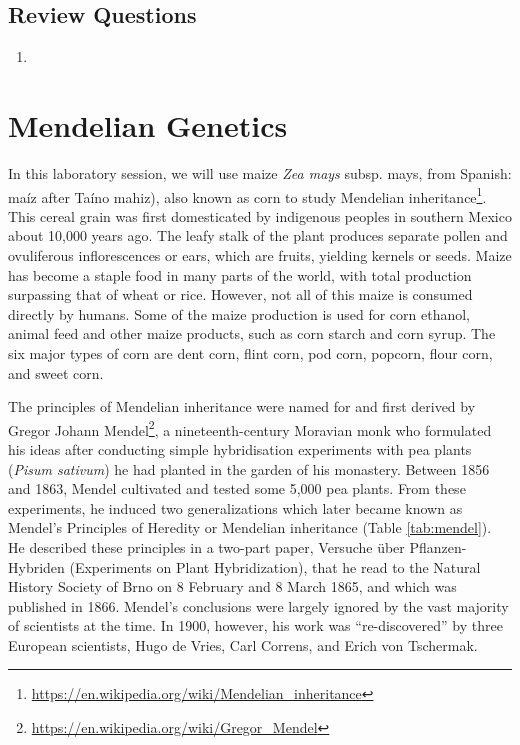 \documentclass[]{book}
\let\rmarkdownfootnote\footnote%
\def\footnote{\protect\rmarkdownfootnote}
\renewcommand{\href}[2]{#2\footnote{\url{#1}}}
\theoremstyle{definition}
\theoremstyle{definition}
\theoremstyle{definition}
\theoremstyle{remark}
\begin{document}
\section{Review Questions}\label{review-questions-1}

\begin{enumerate}
\def\labelenumi{\arabic{enumi}.}
\item
\end{enumerate}

\chapter{Mendelian Genetics}\label{mendelian-genetics}

In this laboratory session, we will use maize \emph{Zea mays} subsp.
mays, from Spanish: maíz after Taíno mahiz), also known as corn to study
\href{https://en.wikipedia.org/wiki/Mendelian_inheritance}{Mendelian
inheritance}. This cereal grain was first domesticated by indigenous
peoples in southern Mexico about 10,000 years ago. The leafy stalk of
the plant produces separate pollen and ovuliferous inflorescences or
ears, which are fruits, yielding kernels or seeds. Maize has become a
staple food in many parts of the world, with total production surpassing
that of wheat or rice. However, not all of this maize is consumed
directly by humans. Some of the maize production is used for corn
ethanol, animal feed and other maize products, such as corn starch and
corn syrup. The six major types of corn are dent corn, flint corn, pod
corn, popcorn, flour corn, and sweet corn.

The principles of Mendelian inheritance were named for and first derived
by \href{https://en.wikipedia.org/wiki/Gregor_Mendel}{Gregor Johann
Mendel}, a nineteenth-century Moravian monk who formulated his ideas
after conducting simple hybridisation experiments with pea plants
(\emph{Pisum sativum}) he had planted in the garden of his monastery.
Between 1856 and 1863, Mendel cultivated and tested some 5,000 pea
plants. From these experiments, he induced two generalizations which
later became known as Mendel's Principles of Heredity or Mendelian
inheritance (Table \ref{tab:mendel}). He described these principles in a
two-part paper, Versuche über Pflanzen-Hybriden (Experiments on Plant
Hybridization), that he read to the Natural History Society of Brno on 8
February and 8 March 1865, and which was published in 1866. Mendel's
conclusions were largely ignored by the vast majority of scientists at
the time. In 1900, however, his work was ``re-discovered'' by three
European scientists, Hugo de Vries, Carl Correns, and Erich von
Tschermak.
\end{document}

